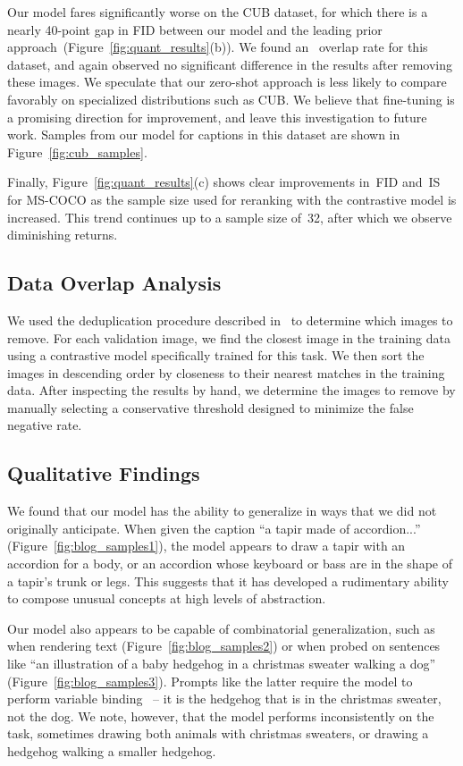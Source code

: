 \documentclass{article}
\begin{document}
Our model fares significantly worse on the CUB dataset, for which there is a nearly 40-point gap in FID between our model and the leading prior approach~(Figure~\ref{fig:quant_results}(b)). We found an~ overlap rate for this dataset, and again observed no significant difference in the results after removing these images. We speculate that our zero-shot approach is less likely to compare favorably on specialized distributions such as CUB. We believe that fine-tuning is a promising direction for improvement, and leave this investigation to future work. Samples from our model for captions in this dataset are shown in Figure~\ref{fig:cub_samples}.

Finally, Figure~\ref{fig:quant_results}(c) shows clear improvements in~FID and~IS for MS-COCO as the sample size used for reranking with the contrastive model is increased. This trend continues up to a sample size of~32, after which we observe diminishing returns.

\subsection{Data Overlap Analysis}
\label{sec:data_overlap_analysis}

We used the deduplication procedure described in~\citet{radford2021learning} to determine which images to remove. For each validation image, we find the closest image in the training data using a contrastive model specifically trained for this task. We then sort the images in descending order by closeness to their nearest matches in the training data. After inspecting the results by hand, we determine the images to remove by manually selecting a conservative threshold designed to minimize the false negative rate.

\subsection{Qualitative Findings}
\label{sec:qual_findings}

We found that our model has the ability to generalize in ways that we did not originally anticipate. When given the caption ``a tapir made of accordion...'' (Figure~\ref{fig:blog_samples1}), the model appears to draw a tapir with an accordion for a body, or an accordion whose keyboard or bass are in the shape of a tapir's trunk or legs. This suggests that it has developed a rudimentary ability to compose unusual concepts at high levels of abstraction.

Our model also appears to be capable of combinatorial generalization, such as when rendering text (Figure~\ref{fig:blog_samples2}) or when probed on sentences like ``an illustration of a baby hedgehog in a christmas sweater walking a dog'' (Figure~\ref{fig:blog_samples3}). Prompts like the latter require the model to perform variable binding~\cite{smolensky1990tensor,greff2020binding} -- it is the hedgehog that is in the christmas sweater, not the dog. We note, however, that the model performs inconsistently on the task, sometimes drawing both animals with christmas sweaters, or drawing a hedgehog walking a smaller hedgehog.
\end{document}
